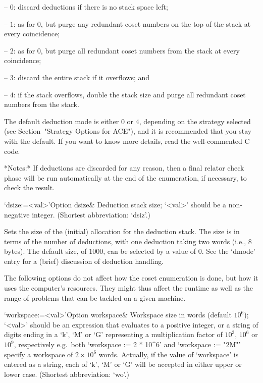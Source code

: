 \beginlist

\item{--} $0$:  
discard deductions if there is no stack space left;

\item{--} $1$: 
as for $0$, but purge any redundant coset numbers on the  top  of  the
stack at every coincidence;

\item{--} $2$: 
as for 0, but purge all redundant coset  numbers  from  the  stack  at
every coincidence;

\item{--} $3$:
discard the entire stack if it overflows; and

\item{--} $4$:
if the stack overflows, double the stack size and purge all  redundant
coset numbers from the stack.

\endlist

The default deduction mode is either $0$  or  $4$,  depending  on  the
strategy selected (see Section~"Strategy Options for ACE"), and it  is
recommended that you stay with the default. If you want to  know  more
details, read the well-commented C code.

*Notes:*
If deductions are discarded for any reason, then a final relator check
phase  will be run  automatically at  the end  of the  enumeration, if
necessary, to check the result.

\>`dsize:=<val>'{Option dsize}&
Deduction stack size; `<val>' should be a non-negative integer.
(Shortest abbreviation: `dsiz'.)

Sets the  size of  the (initial) allocation  for the  deduction stack.
The size is  in terms of the number of  deductions, with one deduction
taking two words (i.e., 8 bytes).  The default size, of $1000$, can be
selected  by  a value  of  0.   See the  `dmode' entry  for a  (brief)
discussion of deduction handling.

\enditems


The following options do not affect how the coset enumeration is done,
but how it  uses the computer's resources. They  might thus affect the
runtime as  well as  the range of  problems that  can be tackled  on a
given machine.

\beginitems

\>`workspace:=<val>'{Option workspace}&
Workspace size in words (default $10^6$);
`<val>' should be an expression that evaluates to a positive  integer,
or a string of digits ending in a  `k',  `M'  or  `G'  representing  a
multiplication  factor  of  $10^3$,  $10^6$  or  $10^9$,  respectively
e.g.~both `workspace := 2 * 10^6' and `workspace :=  "2M"'  specify  a
workspace  of  $2\times10^6$  words.  Actually,  if   the   value   of
`workspace' is entered as a string, each of `k', `M' or  `G'  will  be
accepted in either upper or lower case. (Shortest abbreviation: `wo'.)

